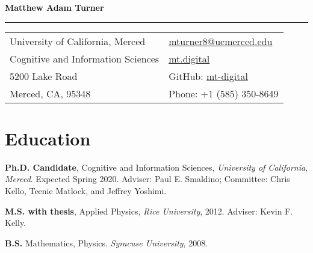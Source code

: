 \documentclass[letterpaper,11pt,oneside]{article}
\begin{document}

\noindent  \textcolor{gunmetal}{\LARGE{\textbf{Matthew Adam Turner}}} \\
\vspace{-2ex}
\hrule 
\normalsize


\begin{center}
\begin{tabular}{l l}
 University of California, Merced & \hspace{1in} \href{mailto:mturner8@ucmerced.edu}{mturner8@ucmerced.edu} \\
 Cognitive and Information Sciences    & \hspace{1in}  \href{http://mt.digital}{mt.digital}   \\
  5200 Lake Road             & \hspace{1in} GitHub: \href{https://github.com/mt-digital}{mt-digital}  \\
 Merced, CA, 95348 & \hspace{1in} Phone: +1 (585) 350-8649 \\
\end{tabular}
\end{center}


\section*{\textcolor{gunmetal}{Education}}

  \begin{hangparas}{0.25in}{1}

    \textbf{Ph.D. Candidate}, Cognitive and Information 
      Sciences, \emph{University of California, Merced}. Expected Spring 2020. Adviser: Paul E. Smaldino; Committee:
    Chris Kello, Teenie Matlock, and Jeffrey Yoshimi.

    \textbf{M.S. with thesis}, Applied Physics, \emph{Rice University}, 2012. Adviser: 
      Kevin F. Kelly.

    \textbf{B.S.} Mathematics, Physics. \emph{Syracuse University}, 2008.
  \end{hangparas}
\end{document}
